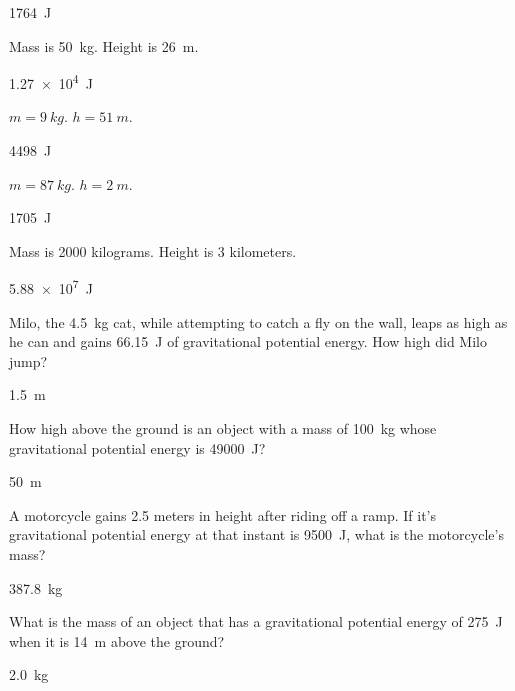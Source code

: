 \documentclass[]{exam}
\begin{document}
\begin{questions}
\begin{solution}
\SI{1764}{J}
\end{solution}


\question \label{NS8TFJ}
Mass is \SI{50}{kg}. Height is \SI{26}{m}.

\begin{solution}
\SI{1.27e4}{J}
\end{solution}


\question \label{29XPZj}
$m = \SI{9}{kg}$. $h = \SI{51}{m}$.

\begin{solution}
\SI{4498}{J}
\end{solution}


\question \label{Fv0opf}
$m = \SI{87}{kg}$. $h = \SI{2}{m}$.

\begin{solution}
\SI{1705}{J}
\end{solution}


\question \label{Y0v7pI}
Mass is 2000 kilograms. Height is 3 kilometers.

\begin{solution}
\SI{5.88e7}{J}
\end{solution}


\question \label{CdBjWD}
Milo, the \SI{4.5}{kg} cat, while attempting to catch a fly on the wall, leaps as high as he can and gains \SI{66.15}{J} of gravitational potential energy. How high did Milo jump?

\begin{solution}
\SI{1.5}{m}
\end{solution}


\question \label{M8oc7x}
How high above the ground is an object with a mass of \SI{100}{kg} whose gravitational potential energy is \SI{49000}{J}?

\begin{solution}
\SI{50}{m}
\end{solution}

\question \label{4S3f3k}
A motorcycle gains 2.5 meters in height after riding off a ramp. If it's gravitational potential energy at that instant is \SI{9500}{J}, what is the motorcycle's mass?

\begin{solution}
\SI{387.8}{kg}
\end{solution}

\question \label{JangCo}
What is the mass of an object that has a gravitational potential energy of \SI{275}{J} when it is \SI{14}{m} above the ground?

\begin{solution}
\SI{2.0}{kg}
\end{solution}




\end{questions}
\end{document}
